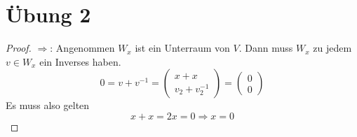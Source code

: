 \documentclass[a4paper,10pt]{article}
\begin{document}
\section*{Übung 2}

\begin{proof}
 $\Rightarrow$: Angenommen $W_x$ ist ein Unterraum von $V$.
 Dann muss $W_x$ zu jedem $v \in W_x$ ein Inverses haben.
 \begin{equation*}
  0 = v + v^{-1} = \begin{pmatrix}x + x\\v_2 + v^{-1}_2\end{pmatrix} = \begin{pmatrix}0\\0\end{pmatrix}
 \end{equation*}
 Es muss also gelten
 \begin{equation*}
  x + x = 2x = 0 \Rightarrow x = 0
 \end{equation*}


\end{proof}
\end{document}
